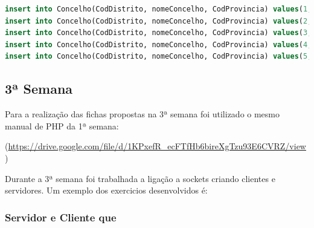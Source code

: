 \documentclass[14pt]{article}
\begin{document}
\begin{lstlisting}[language=SQL]
insert into Concelho(CodDistrito, nomeConcelho, CodProvincia) values(1,'Alcobaça',1);
insert into Concelho(CodDistrito, nomeConcelho, CodProvincia) values(2,'Alcobaça',1);
insert into Concelho(CodDistrito, nomeConcelho, CodProvincia) values(3,'Castelo de Paiva',2);
insert into Concelho(CodDistrito, nomeConcelho, CodProvincia) values(4,'Fundão',3);
insert into Concelho(CodDistrito, nomeConcelho, CodProvincia) values(5,'Arganil',3);

\end{lstlisting}


\subsection{3ª Semana}
Para a realização das fichas propostas na 3ª semana foi utilizado o mesmo manual de PHP da 1ª semana:

(\url{https://drive.google.com/file/d/1KPxefR_ecFTfHb6bireXgTzu93E6CVRZ/view})

Durante a 3ª semana foi trabalhada a ligação a sockets criando clientes e servidores.
Um exemplo dos exercicios desenvolvidos é:

\subsubsection{Servidor e Cliente que }
\end{document}
